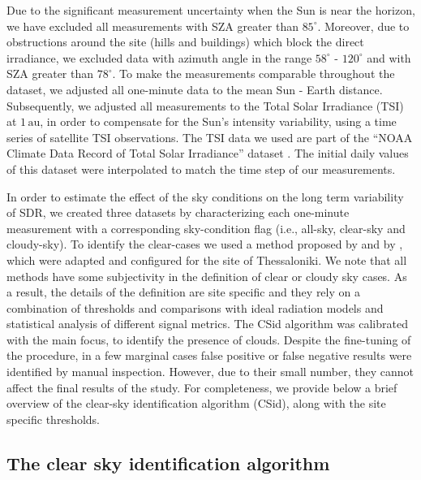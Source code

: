 \documentclass[applsci,article,submit,moreauthors,pdftex]{Definitions/mdpi}
\begin{document}
Due to the significant measurement uncertainty when the Sun is near the
horizon, we have excluded all measurements with SZA greater than
\(85^\circ\). Moreover, due to obstructions around the site (hills and
buildings) which block the direct irradiance, we excluded data with
azimuth angle in the range \(58^{\circ}\) - \(120^{\circ}\) and with SZA
greater than \(78^{\circ}\). To make the measurements comparable
throughout the dataset, we adjusted all one-minute data to the mean Sun
- Earth distance. Subsequently, we adjusted all measurements to the
Total Solar Irradiance (TSI) at \(1\,\text{au}\), in order to compensate
for the Sun's intensity variability, using a time series of satellite
TSI observations. The TSI data we used are part of the ``NOAA Climate
Data Record of Total Solar Irradiance'' dataset \citep{Coddington2005}.
The initial daily values of this dataset were interpolated to match the
time step of our measurements.

In order to estimate the effect of the sky conditions on the long term
variability of SDR, we created three datasets by characterizing each
one-minute measurement with a corresponding sky-condition flag (i.e.,
all-sky, clear-sky and cloudy-sky). To identify the clear-cases we used
a method proposed by \citet{Long2000} and by \citet{Reno2016}, which
were adapted and configured for the site of Thessaloniki. We note that
all methods have some subjectivity in the definition of clear or cloudy
sky cases. As a result, the details of the definition are site specific
and they rely on a combination of thresholds and comparisons with ideal
radiation models and statistical analysis of different signal metrics.
The CSid algorithm was calibrated with the main focus, to identify the
presence of clouds. Despite the fine-tuning of the procedure, in a few
marginal cases false positive or false negative results were identified
by manual inspection. However, due to their small number, they cannot
affect the final results of the study. For completeness, we provide
below a brief overview of the clear-sky identification algorithm (CSid),
along with the site specific thresholds.

\hypertarget{the-clear-sky-identification-algorithm}{%
\subsection{The clear sky identification
algorithm}\label{the-clear-sky-identification-algorithm}}
\end{document}
